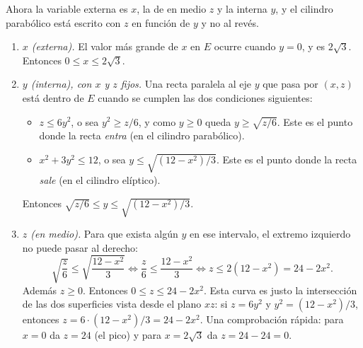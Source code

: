 \begin{respuesta}
    \bigskip
    Ahora la variable
    externa es $x$, la de en medio $z$ y la interna $y$, y el cilindro parabólico
    está escrito con $z$ en función de $y$ y no al revés.
    \begin{enumerate}
        \item \emph{$x$ (externa).} El valor más grande de $x$ en $E$ ocurre cuando $y=0$,
              y es $2\sqrt{3}$. Entonces $0\leq x\leq 2\sqrt{3}$.
        \item \emph{$y$ (interna), con $x$ y $z$ fijos.} Una recta paralela al eje $y$
              que pasa por $(x,z)$ está dentro de $E$ cuando se cumplen las dos
              condiciones siguientes:
              \begin{itemize}
                  \item $z\leq 6y^2$, o sea $y^2\geq z/6$, y como $y\geq 0$ queda
                        $y\geq\sqrt{z/6}$. Este es el punto donde la recta
                        \emph{entra} (en el cilindro parabólico).
                  \item $x^2+3y^2\leq 12$, o sea $y\leq\sqrt{(12-x^2)/3}$. Este es el
                        punto donde la recta \emph{sale} (en el cilindro elíptico).
              \end{itemize}
              Entonces $\sqrt{z/6}\leq y\leq\sqrt{(12-x^2)/3}$.
        \item \emph{$z$ (en medio).} Para que exista algún $y$ en ese intervalo, el
              extremo izquierdo no puede pasar al derecho:
              \[
                  \sqrt{\frac{z}{6}} \leq \sqrt{\frac{12-x^2}{3}}
                  \iff \frac{z}{6}\leq\frac{12-x^2}{3}
                  \iff z\leq 2(12-x^2) = 24-2x^2 .
              \]
              Además $z\geq 0$. Entonces $0\leq z\leq 24-2x^2$. Esta curva es justo la
              intersección de las dos superficies vista desde el plano $xz$: si
              $z=6y^2$ y $y^2=(12-x^2)/3$, entonces $z = 6\cdot(12-x^2)/3 = 24-2x^2$.
              Una comprobación rápida: para $x=0$ da $z=24$ (el pico) y para
              $x=2\sqrt{3}$ da $z=24-24=0$.
    \end{enumerate}

    \begin{center}


\end{center}
\end{respuesta}
